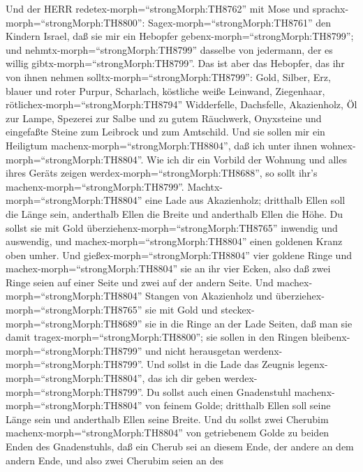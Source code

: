  Und der HERR redetex-morph=``strongMorph:TH8762'' mit Mose
und sprachx-morph=``strongMorph:TH8800'': 
Sagex-morph=``strongMorph:TH8761'' den Kindern Israel, daß sie mir ein
Hebopfer gebenx-morph=``strongMorph:TH8799''; und
nehmtx-morph=``strongMorph:TH8799'' dasselbe von jedermann, der es
willig gibtx-morph=``strongMorph:TH8799''.  Das ist aber das
Hebopfer, das ihr von ihnen nehmen solltx-morph=``strongMorph:TH8799'':
Gold, Silber, Erz,  blauer und roter Purpur, Scharlach,
köstliche weiße Leinwand, Ziegenhaar, 
rötlichex-morph=``strongMorph:TH8794'' Widderfelle, Dachsfelle,
Akazienholz,  Öl zur Lampe, Spezerei zur Salbe und zu gutem
Räuchwerk,  Onyxsteine und eingefaßte Steine zum Leibrock
und zum Amtschild.  Und sie sollen mir ein Heiligtum
machenx-morph=``strongMorph:TH8804'', daß ich unter ihnen
wohnex-morph=``strongMorph:TH8804''.  Wie ich dir ein
Vorbild der Wohnung und alles ihres Geräts zeigen
werdex-morph=``strongMorph:TH8688'', so sollt ihr's
machenx-morph=``strongMorph:TH8799''. 
Machtx-morph=``strongMorph:TH8804'' eine Lade aus Akazienholz; dritthalb
Ellen soll die Länge sein, anderthalb Ellen die Breite und anderthalb
Ellen die Höhe.  Du sollst sie mit Gold
überziehenx-morph=``strongMorph:TH8765'' inwendig und auswendig, und
machex-morph=``strongMorph:TH8804'' einen goldenen Kranz oben umher.
 Und gießex-morph=``strongMorph:TH8804'' vier goldene Ringe
und machex-morph=``strongMorph:TH8804'' sie an ihr vier Ecken, also daß
zwei Ringe seien auf einer Seite und zwei auf der andern Seite.
 Und machex-morph=``strongMorph:TH8804'' Stangen von
Akazienholz und überziehex-morph=``strongMorph:TH8765'' sie mit Gold
 und steckex-morph=``strongMorph:TH8689'' sie in die Ringe
an der Lade Seiten, daß man sie damit
tragex-morph=``strongMorph:TH8800'';  sie sollen in den
Ringen bleibenx-morph=``strongMorph:TH8799'' und nicht herausgetan
werdenx-morph=``strongMorph:TH8799''.  Und sollst in die
Lade das Zeugnis legenx-morph=``strongMorph:TH8804'', das ich dir geben
werdex-morph=``strongMorph:TH8799''.  Du sollst auch einen
Gnadenstuhl machenx-morph=``strongMorph:TH8804'' von feinem Golde;
dritthalb Ellen soll seine Länge sein und anderthalb Ellen seine Breite.
 Und du sollst zwei Cherubim
machenx-morph=``strongMorph:TH8804'' von getriebenem Golde zu beiden
Enden des Gnadenstuhls,  daß ein Cherub sei an diesem Ende,
der andere an dem andern Ende, und also zwei Cherubim seien an des
